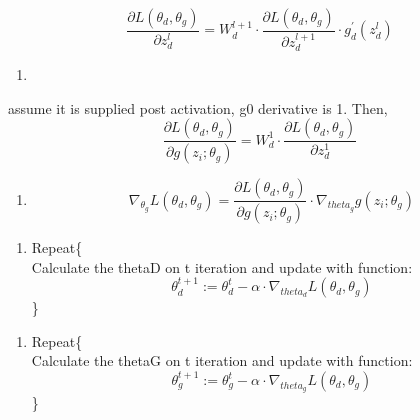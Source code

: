 \documentclass[11pt]{article}
\providecommand{\tightlist}{%
      \setlength{\itemsep}{0pt}\setlength{\parskip}{0pt}}
\begin{document}
\begin{equation}
\frac{\partial L(\theta_d, \theta_g)}{\partial z_d^{l}} =  W_d^{l+1} \cdot  \frac{\partial L(\theta_d, \theta_g)}{\partial z_d^{l+1}} \cdot g_d^{'}(z_d^{l})
\end{equation}

    \begin{enumerate}
\def\labelenumi{(\roman{enumi})}
\setcounter{enumi}{3}
\tightlist
\item
\end{enumerate}

assume it is supplied post activation, g0 derivative is 1. Then,
\begin{equation}
\frac{\partial L(\theta_d, \theta_g)}{\partial g(z_i; \theta_g)} =  W_d^{1} \cdot  \frac{\partial L(\theta_d, \theta_g)}{\partial z_d^{1}}
\end{equation}

    \begin{enumerate}
\def\labelenumi{(\alph{enumi})}
\setcounter{enumi}{21}
\tightlist
\item
  \begin{equation}
  \nabla_{\theta_{g}} L(\theta_d, \theta_g) = \frac{\partial L(\theta_d, \theta_g)}{\partial g(z_i; \theta_g)} \cdot \nabla_{theta_g}g(z_i; \theta_g)
  \end{equation}
\end{enumerate}

    \begin{enumerate}
\def\labelenumi{(\roman{enumi})}
\setcounter{enumi}{5}
\tightlist
\item
  Repeat\{\\
  \hspace*{0.333em}Calculate the thetaD on t iteration and update with
  function: \begin{equation}
  \theta_d^{t+1} := \theta_d^{t} - \alpha \cdot \nabla_{theta_d}L(\theta_d, \theta_g)
  \end{equation} \}
\end{enumerate}

    \begin{enumerate}
\def\labelenumi{(\roman{enumi})}
\setcounter{enumi}{6}
\tightlist
\item
  Repeat\{\\
  \hspace*{0.333em} Calculate the thetaG on t iteration and update with
  function: \begin{equation}
  \theta_g^{t+1} := \theta_g^{t} - \alpha \cdot \nabla_{theta_g}L(\theta_d, \theta_g)
  \end{equation} \}
\end{enumerate}
\end{document}
